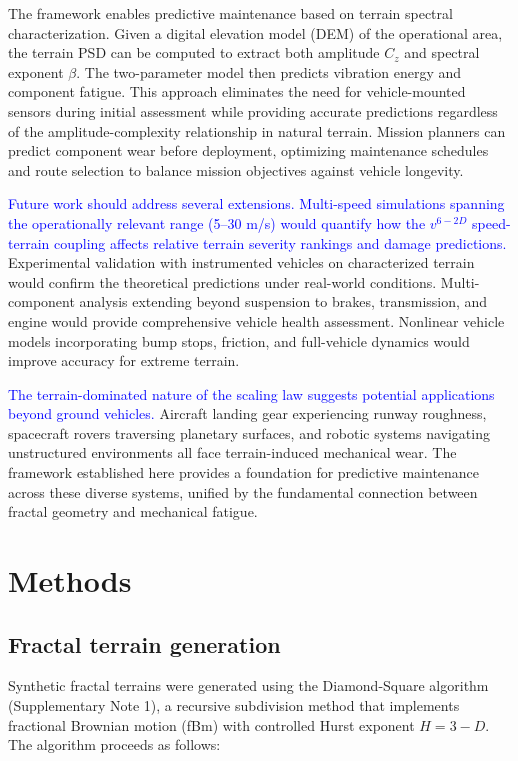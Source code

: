 \documentclass[11pt]{article}
\begin{document}
The framework enables predictive maintenance based on terrain spectral characterization. Given a digital elevation model (DEM) of the operational area, the terrain PSD can be computed to extract both amplitude $C_z$ and spectral exponent $\beta$. The two-parameter model then predicts vibration energy and component fatigue. This approach eliminates the need for vehicle-mounted sensors during initial assessment while providing accurate predictions regardless of the amplitude-complexity relationship in natural terrain. Mission planners can predict component wear before deployment, optimizing maintenance schedules and route selection to balance mission objectives against vehicle longevity.

\textcolor{blue}{Future work should address several extensions. Multi-speed simulations spanning the operationally relevant range (5--30 m/s) would quantify how the $v^{6-2D}$ speed-terrain coupling affects relative terrain severity rankings and damage predictions.} Experimental validation with instrumented vehicles on characterized terrain would confirm the theoretical predictions under real-world conditions. Multi-component analysis extending beyond suspension to brakes, transmission, and engine would provide comprehensive vehicle health assessment. Nonlinear vehicle models incorporating bump stops, friction, and full-vehicle dynamics would improve accuracy for extreme terrain.

\textcolor{blue}{The terrain-dominated nature of the scaling law suggests potential applications beyond ground vehicles.} Aircraft landing gear experiencing runway roughness, spacecraft rovers traversing planetary surfaces, and robotic systems navigating unstructured environments all face terrain-induced mechanical wear. The framework established here provides a foundation for predictive maintenance across these diverse systems, unified by the fundamental connection between fractal geometry and mechanical fatigue.


\section*{Methods}

\subsection*{Fractal terrain generation}

Synthetic fractal terrains were generated using the Diamond-Square algorithm\cite{Voss1985} (Supplementary Note 1), a recursive subdivision method that implements fractional Brownian motion (fBm) with controlled Hurst exponent $H = 3-D$. The algorithm proceeds as follows:
\end{document}
